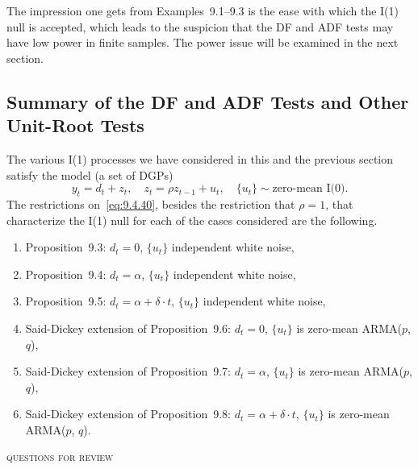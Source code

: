 The impression one gets from Examples~9.1--9.3 is the ease with which the I(1)
null is accepted, which leads to the suspicion that the DF and ADF tests may have
low power in finite samples. The power issue will be examined in the next section.

\subsection*{Summary of the DF and ADF Tests and Other Unit-Root Tests}

The various I(1) processes we have considered in this and the previous section
satisfy the model (a set of DGPs)
\begin{equation}
\label{eq:9.4.40}
y_t = d_t + z_t, \quad z_t = \rho z_{t-1} + u_t, \quad
\{u_t\} \sim \text{zero-mean I(0).}
\end{equation}
The restrictions on~\eqref{eq:9.4.40}, besides the restriction that $\rho = 1$, that characterize the
I(1) null for each of the cases considered are the following.

\begin{enumerate}
\item Proposition~9.3: $d_t = 0$, $\{u_t\}$ independent white noise,
\item Proposition~9.4: $d_t = \alpha$, $\{u_t\}$ independent white noise,
\item Proposition~9.5: $d_t = \alpha + \delta \cdot t$, $\{u_t\}$ independent white noise,
\item Said-Dickey extension of Proposition~9.6: $d_t = 0$, $\{u_t\}$ is zero-mean
ARMA($p$, $q$),
\item Said-Dickey extension of Proposition~9.7: $d_t = \alpha$, $\{u_t\}$ is zero-mean
ARMA($p$, $q$),
\item Said-Dickey extension of Proposition~9.8: $d_t = \alpha + \delta \cdot t$, $\{u_t\}$ is zero-mean
ARMA($p$, $q$).
\end{enumerate}

\bigskip
\noindent\textsc{questions for review} \hrulefill

